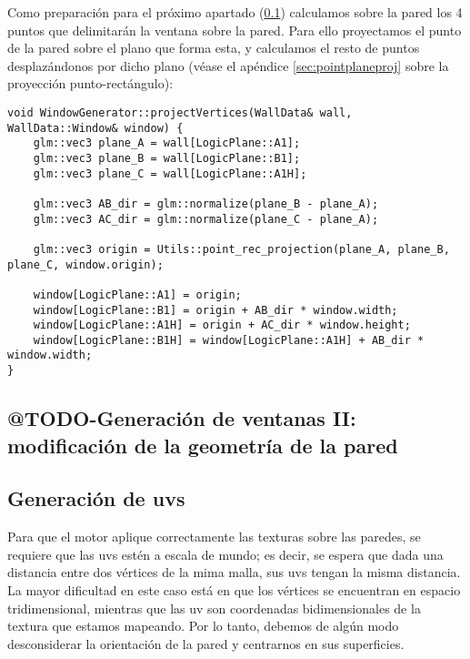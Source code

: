 Como preparación para el próximo apartado (\ref{sec:wallgeowindows}) calculamos sobre la pared los 4 puntos que delimitarán la ventana sobre la pared. Para ello proyectamos el punto de la pared sobre el plano que forma esta, y calculamos el resto de puntos desplazándonos por dicho plano (véase el apéndice \ref{sec:pointplaneproj} sobre la proyección punto-rectángulo):

\begin{lstlisting}
void WindowGenerator::projectVertices(WallData& wall, WallData::Window& window) {
	glm::vec3 plane_A = wall[LogicPlane::A1];
	glm::vec3 plane_B = wall[LogicPlane::B1];
	glm::vec3 plane_C = wall[LogicPlane::A1H];

	glm::vec3 AB_dir = glm::normalize(plane_B - plane_A);
	glm::vec3 AC_dir = glm::normalize(plane_C - plane_A);

	glm::vec3 origin = Utils::point_rec_projection(plane_A, plane_B, plane_C, window.origin);

	window[LogicPlane::A1] = origin;
	window[LogicPlane::B1] = origin + AB_dir * window.width;
	window[LogicPlane::A1H] = origin + AC_dir * window.height;
	window[LogicPlane::B1H] = window[LogicPlane::A1H] + AB_dir * window.width;
}
\end{lstlisting}

\subsection{@TODO-Generación de ventanas II: modificación de la geometría de la pared}
\label{sec:wallgeowindows}

\subsection{Generación de uvs}
Para que el motor aplique correctamente las texturas sobre las paredes, se requiere que las uvs estén a escala de mundo; es decir, se espera que dada una distancia entre dos vértices de la mima malla, sus uvs tengan la misma distancia. La mayor dificultad en este caso está en que los vértices se encuentran en espacio tridimensional, mientras que las uv son coordenadas bidimensionales de la textura que estamos mapeando. Por lo tanto, debemos de algún modo desconsiderar la orientación de la pared y centrarnos en sus superficies.


